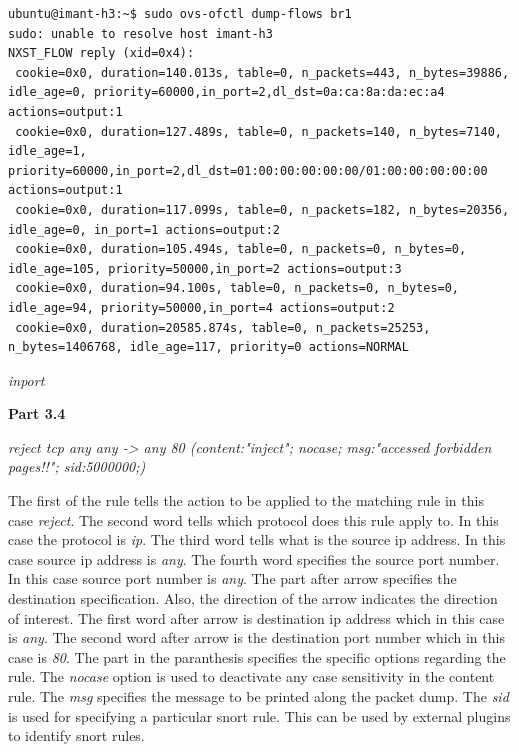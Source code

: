 \documentclass[12pt]{article}
\begin{document}
\begin{verbatim}
ubuntu@imant-h3:~$ sudo ovs-ofctl dump-flows br1
sudo: unable to resolve host imant-h3
NXST_FLOW reply (xid=0x4):
 cookie=0x0, duration=140.013s, table=0, n_packets=443, n_bytes=39886, idle_age=0, priority=60000,in_port=2,dl_dst=0a:ca:8a:da:ec:a4 actions=output:1
 cookie=0x0, duration=127.489s, table=0, n_packets=140, n_bytes=7140, idle_age=1, priority=60000,in_port=2,dl_dst=01:00:00:00:00:00/01:00:00:00:00:00 actions=output:1
 cookie=0x0, duration=117.099s, table=0, n_packets=182, n_bytes=20356, idle_age=0, in_port=1 actions=output:2
 cookie=0x0, duration=105.494s, table=0, n_packets=0, n_bytes=0, idle_age=105, priority=50000,in_port=2 actions=output:3
 cookie=0x0, duration=94.100s, table=0, n_packets=0, n_bytes=0, idle_age=94, priority=50000,in_port=4 actions=output:2
 cookie=0x0, duration=20585.874s, table=0, n_packets=25253, n_bytes=1406768, idle_age=117, priority=0 actions=NORMAL

\end{verbatim}


\vspace{2mm} 
\textit{inport}
\vspace{2mm} 

\textbf{Part 3.4}

\vspace{2mm} 
\textit{reject tcp any any -> any 80 (content:"inject"; nocase; msg:"accessed forbidden pages!!"; sid:5000000;)}
\vspace{2mm} 

The first of the rule tells the action to be applied to the matching rule in 
this case \textit{reject}. The second word tells which protocol does this 
rule apply to. In this case the protocol is \textit{ip}. The third word 
tells what is the source ip address. In this case source ip address 
is \textit{any}. The fourth word specifies the source port number. 
In this case source port number is \textit{any}. The part after arrow specifies 
the destination specification. Also, the direction of the arrow indicates the 
direction of interest. The first word after arrow is destination ip address 
which in this case is \textit{any}. The second word
after arrow is the destination port number which in this case is \textit{80}.
The part in the paranthesis specifies the specific options regarding the rule. 
The \textit{nocase} option is used to deactivate any case sensitivity in the 
content rule. The \textit{msg} specifies the message to be printed along the 
packet dump. The \textit{sid} is used for specifying a particular snort rule.
This can be used by external plugins to identify snort rules.
\end{document}
